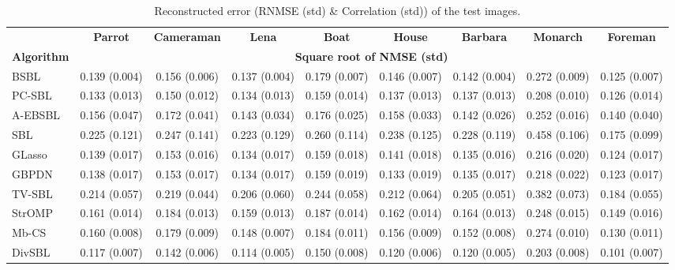 \documentclass[lettersize,journal]{IEEEtran}
\theoremstyle{remark}
\begin{document}
\begin{table}[!t]
	\caption{Reconstructed error (RNMSE (std) \& Correlation (std)) of the test images.}
	\label{8images}
	\vskip 0.05in
	\setlength{\tabcolsep}{0.24cm}
	\centering
		\begin{tabular}{lcccccccc}
			\toprule
			& \textbf{Parrot} & \textbf{Cameraman} & \textbf{Lena} & \textbf{Boat} & \textbf{House} & \textbf{Barbara} & \textbf{Monarch} & \textbf{Foreman} \\ \cmidrule(lr){2-9}
			\textbf{Algorithm} & \multicolumn{8}{c}{\textbf{Square root of NMSE (std)}} \\
			\midrule
			{BSBL}           & 0.139 (0.004) & 0.156 (0.006) & 0.137 (0.004) & 0.179 (0.007) & 0.146 (0.007) & 0.142 (0.004) & 0.272 (0.009) & 0.125 (0.007) \\
			{PC-SBL}         & 0.133 (0.013) & 0.150 (0.012) & 0.134 (0.013) & 0.159 (0.014) & 0.137 (0.013) & 0.137 (0.013) & 0.208 (0.010) & 0.126 (0.014) \\
			{A-EBSBL}         & 0.156 (0.047) & 0.172 (0.041) & 0.143 (0.034) & 0.176 (0.025) & 0.158 (0.033) & 0.142 (0.026) & 0.252 (0.016) & 0.140 (0.040) \\
			{SBL}            & 0.225 (0.121) & 0.247 (0.141) & 0.223 (0.129) & 0.260 (0.114) & 0.238 (0.125) & 0.228 (0.119) & 0.458 (0.106) & 0.175 (0.099) \\
			{GLasso}    & 0.139 (0.017) & 0.153 (0.016) & 0.134 (0.017) & 0.159 (0.018) & 0.141 (0.018) & 0.135 (0.016) & 0.216 (0.020) & 0.124 (0.017) \\
			{GBPDN}     & 0.138 (0.017) & 0.153 (0.017) & 0.134 (0.017) & 0.159 (0.019) & 0.133 (0.019) & 0.135 (0.017) & 0.218 (0.022) & 0.123 (0.017) \\
			{TV-SBL}     & 0.214 (0.057) & 0.219 (0.044) & 0.206 (0.060) & 0.244 (0.058) & 0.212 (0.064) & 0.205 (0.051) & 0.382 (0.073) & 0.184  (0.055) \\
			{StrOMP}      & 0.161 (0.014) & 0.184 (0.013) & 0.159 (0.013) & 0.187 (0.014) & 0.162 (0.014) & 0.164 (0.013) & 0.248 (0.015) & 0.149 (0.016) \\
			Mb-CS & 0.160 (0.008) & 0.179 (0.009) & 0.148 (0.007) & 0.184 (0.011) & 0.156 (0.009) & 0.152 (0.008) & 0.274 (0.010) & 0.130 (0.011)\\
			{DivSBL}         & 0.117 (0.007) & 0.142 (0.006) & 0.114 (0.005) & 0.150 (0.008) & 0.120 (0.006) & 0.120 (0.005) & 0.203 (0.008) & 0.101 (0.007) \\
			

\end{tabular}
\end{table}
\end{document}
